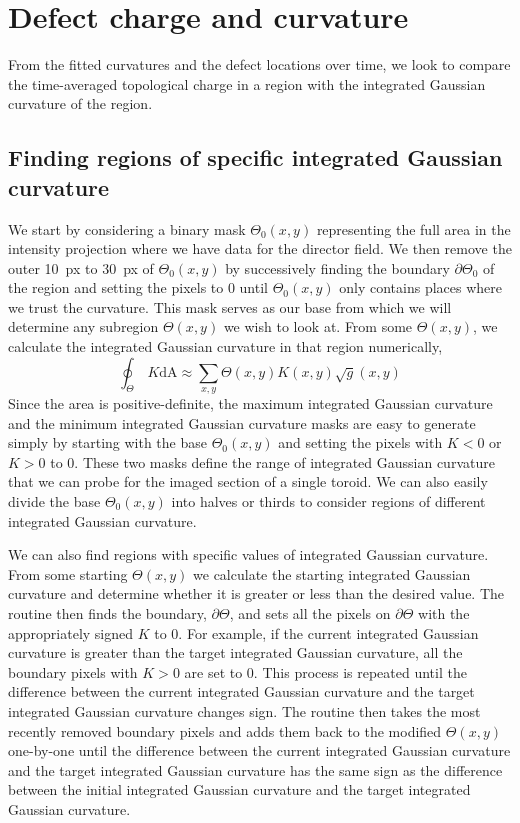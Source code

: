 \section{Defect charge and curvature}
From the fitted curvatures and the defect locations over time, we look to compare the time-averaged topological charge in a region with the integrated Gaussian curvature of the region.


\subsection{Finding regions of specific integrated Gaussian curvature}
We start by considering a binary mask $\Theta_0(x,y)$ representing the full area in the intensity projection where we have data for the director field.
We then remove the outer 10~px to 30~px of $\Theta_0(x,y)$ by successively finding the boundary $\partial \Theta_0$ of the region and setting the pixels to $0$ until $\Theta_0(x,y)$ only contains places where we trust the curvature.
This mask serves as our base from which we will determine any subregion $\Theta(x,y)$ we wish to look at.
From some $\Theta(x,y)$, we calculate the integrated Gaussian curvature in that region numerically,
\begin{equation}
  \oint_{\Theta}\,K\textrm{dA} \approx \sum\limits_{x,y} \Theta(x,y) K(x,y) \sqrt{g}(x,y)
\end{equation}
Since the area is positive-definite, the maximum integrated Gaussian curvature and the minimum integrated Gaussian curvature masks are easy to generate simply by starting with the base $\Theta_0(x,y)$ and setting the pixels with $K < 0$ or $K > 0$ to $0$.
These two masks define the range of integrated Gaussian curvature that we can probe for the imaged section of a single toroid.
We can also easily divide the base $\Theta_0(x,y)$ into halves or thirds to consider regions of different integrated Gaussian curvature.

We can also find regions with specific values of integrated Gaussian curvature.
From some starting $\Theta(x,y)$ we calculate the starting integrated Gaussian curvature and determine whether it is greater or less than the desired value.
The routine then finds the boundary, $\partial \Theta$, and sets all the pixels on $\partial \Theta$ with the appropriately signed $K$ to $0$.
For example, if the current integrated Gaussian curvature is greater than the target integrated Gaussian curvature, all the boundary pixels with $K > 0$ are set to $0$.
This process is repeated until the difference between the current integrated Gaussian curvature and the target integrated Gaussian curvature changes sign.
The routine then takes the most recently removed boundary pixels and adds them back to the modified $\Theta(x,y)$ one-by-one until the difference between the current integrated Gaussian curvature and the target integrated Gaussian curvature has the same sign as the difference between the initial integrated Gaussian curvature and the target integrated Gaussian curvature.


